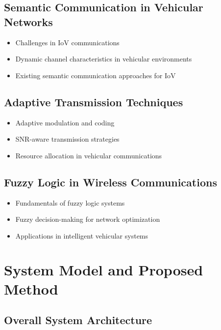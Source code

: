 \documentclass[lettersize,journal]{IEEEtran}
\begin{document}
\subsection{Semantic Communication in Vehicular Networks}

\begin{itemize}
    \item Challenges in IoV communications
    \item Dynamic channel characteristics in vehicular environments
    \item Existing semantic communication approaches for IoV
\end{itemize}

\subsection{Adaptive Transmission Techniques}

\begin{itemize}
    \item Adaptive modulation and coding
    \item SNR-aware transmission strategies
    \item Resource allocation in vehicular communications
\end{itemize}

\subsection{Fuzzy Logic in Wireless Communications}

\begin{itemize}
    \item Fundamentals of fuzzy logic systems
    \item Fuzzy decision-making for network optimization
    \item Applications in intelligent vehicular systems
\end{itemize}

\section{System Model and Proposed Method}

\subsection{Overall System Architecture}
\end{document}
